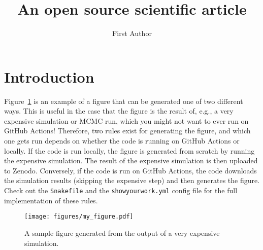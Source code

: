 \documentclass[twocolumn]{aastex631}
\begin{document}
\title{An open source scientific article}

\author{First Author}

\begin{abstract}
    \blindtext
\end{abstract}

\section{Introduction}

Figure~\ref{fig:my_figure} is an example of a figure that can be generated one of two different ways.
This is useful in the case that the figure is the result of, e.g., a very expensive simulation or MCMC run, which you might not want to ever run on GitHub Actions!
Therefore, two rules exist for generating the figure, and which one gets run depends on whether the code is running on GitHub Actions or locally.
If the code is run locally, the figure is generated from scratch by running the expensive simulation.
The result of the expensive simulation is then uploaded to Zenodo.
Conversely, if the code is run on GitHub Actions, the code downloads the simulation results (skipping the expensive step) and then generates the figure.
Check out the \texttt{Snakefile} and the \texttt{showyourwork.yml} config file for the full implementation of these rules.

\begin{figure}[ht!]
    \begin{centering}
        \texttt{[image: figures/my\_figure.pdf]}
        \caption{
            A sample figure generated from the output of a very expensive simulation.
        }
        \label{fig:my_figure}
    \end{centering}
\end{figure}
\end{document}
